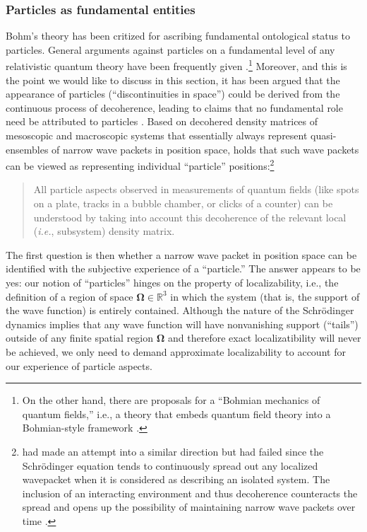 \documentclass[rmp,aps,amsmath,amsfonts,noshowkeys,noshowpacs,12pt]{revtex4}
\begin{document}
\subsubsection{Particles as fundamental entities} 

Bohm's theory has been critized for ascribing fundamental ontological
status to particles. General arguments against particles on a
fundamental level of any relativistic quantum theory have been
frequently given \citetext{see, for instance,
  \citealp{Malament:1996:gt}, and
  \citealp{Halvorson:2002:xz}}.\footnote{On the other hand, there are
  proposals for a ``Bohmian mechanics of quantum fields,'' i.e., a
  theory that embeds quantum field theory into a Bohmian-style
  framework \citep{Durr:2003:gu,Durr:2002:gs}.}  Moreover, and this is
the point we would like to discuss in this section, it has been argued
that the appearance of particles (``discontinuities in space'') could
be derived from the continuous process of decoherence, leading to
claims that no fundamental role need be attributed to particles
\citep{Zeh:1993:lt,Zeh:1999:rr,Zeh:2003:pp}.  Based on decohered
density matrices of mesoscopic and macroscopic systems that
essentially always represent quasi-ensembles of narrow wave packets in
position space, \citet[p.~190]{Zeh:1993:lt} holds that such wave
packets can be viewed as representing individual ``particle''
positions:\footnote{\citet{Schrodinger:1926:pz} had made an attempt
  into a similar direction but had failed since the Schr\"odinger
  equation tends to continuously spread out any localized wavepacket
  when it is considered as describing an isolated system. The
  inclusion of an interacting environment and thus decoherence
  counteracts the spread and opens up the possibility of maintaining
  narrow wave packets over time \citep{Joos:1985:iu}.}
%
\begin{quote} {\small 
    All particle aspects observed in measurements of quantum fields
    (like spots on a plate, tracks in a bubble chamber, or clicks of a
    counter) can be understood by taking into account this decoherence
    of the relevant local (\emph{i.e.}, subsystem) density matrix.}
\end{quote}
%
The first question is then whether a narrow wave packet in position
space can be identified with the subjective experience of a
``particle.'' The answer appears to be yes: our notion of
``particles'' hinges on the property of localizability, i.e., the
definition of a region of space $\mathbf{\Omega} \in \mathbb{R}^3$ in
which the system (that is, the support of the wave function) is
entirely contained. Although the nature of the Schr\"odinger dynamics
implies that any wave function will have nonvanishing support
(``tails'') outside of any finite spatial region $\mathbf{\Omega}$ and
therefore exact localizatibility will never be achieved, we only need
to demand approximate localizability to account for our experience of
particle aspects.
\end{document}
